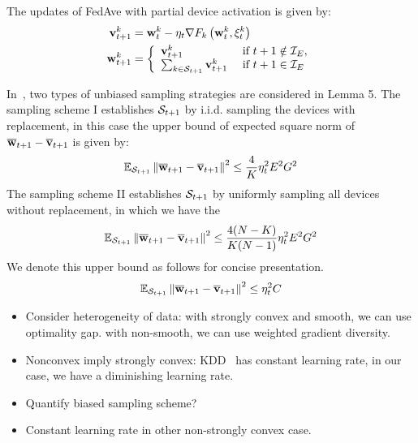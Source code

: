 The updates of FedAve with partial device activation is given by: 
\begin{align} 
\mathbf{v}_{t+1}^{k} &=\mathbf{w}_{t}^{k}-\eta_{t} \nabla F_{k}\left(\mathbf{w}_{t}^{k}, \xi_{t}^{k}\right) \\ \mathbf{w}_{t+1}^{k} &=\left\{\begin{array}{ll}\mathbf{v}_{t+1}^{k} & \text { if } t+1 \notin \mathcal{I}_{E}, \\ 
\sum_{k \in {\mathcal{S}}_{t+1}} \mathbf{v}_{t+1}^{k} & \text { if } t+1 \in \mathcal{I}_{E}\end{array}\right.
\end{align}

In~\cite{li2019convergence}, two types of unbiased sampling strategies are considered in Lemma 5. 
The sampling scheme I establishes ${\mathcal{S}}_{t+1}$ by i.i.d. sampling the devices with replacement,
in this case the upper bound of expected square norm of ${\overline{\mathbf{w}}}_{t+1} - {\overline{\mathbf{v}}}_{t+1}$ is given by:
\begin{align}
\mathbb{E}_{{\mathcal{S}}_{t+1}}\left\|{\overline{\mathbf{w}}}_{t+1} - {\overline{\mathbf{v}}}_{t+1}\right\|^2	\leq \frac{4}{K} \eta_t^2 E^2G^2
\end{align}
The sampling scheme II establishes ${\mathcal{S}}_{t+1}$ by uniformly sampling all devices without
replacement, in which we have the 
\begin{align}
\mathbb{E}_{{\mathcal{S}}_{t+1}}\left\|{\overline{\mathbf{w}}}_{t+1} - {\overline{\mathbf{v}}}_{t+1}\right\|^2	\leq \frac{4(N - K)}{K(N-1)} \eta_t^2 E^2G^2
\end{align}
We denote this upper bound as follows for concise presentation. 
\begin{align}
	\mathbb{E}_{{\mathcal{S}}_{t+1}}\left\|{\overline{\mathbf{w}}}_{t+1} - {\overline{\mathbf{v}}}_{t+1}\right\|^2 \leq  \eta_t^2 C
	\label{eq:partialsample}
\end{align}


\begin{itemize}
	\item Consider heterogeneity of data: with strongly convex and smooth, we can use optimality gap. with non-smooth, we can use weighted gradient diversity. 
	\item Nonconvex imply strongly convex: KDD~\cite{zhuo2019federated} has constant learning rate, in our case, we have a diminishing learning rate. 
	\item Quantify biased sampling scheme?
	\item Constant learning rate in other non-strongly convex case. 
\end{itemize}


